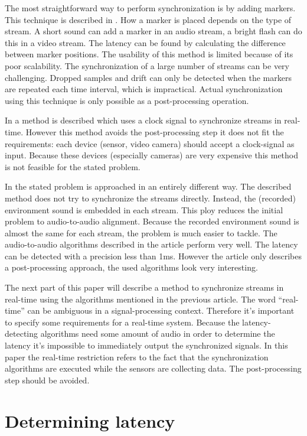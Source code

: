 \documentclass[twocolumn]{phdsymp} %
\begin{document}
The most straightforward way to perform synchronization is by adding markers. This technique is described in \cite{bannach2009automatic}. How a marker is placed depends on the type of stream. A short sound can add a marker in an audio stream, a bright flash can do this in a video stream. The latency can be found by calculating the difference between marker positions. The usability of this method is limited because of its poor scalability. The synchronization of a large number of streams can be very challenging. Dropped samples and drift can only be detected when the markers are repeated each time interval, which is impractical. Actual synchronization using this technique is only possible as a post-processing operation.

In \cite{jaimovich2010synchronization} a method is described which uses a clock signal to synchronize streams in real-time. However this method avoids the post-processing step it does not fit the requirements: each device (sensor, video camera) should accept a clock-signal as input. Because these devices (especially cameras) are very expensive this method is not feasible for the stated problem.

In \cite{six2015multimodal} the stated problem is approached in an entirely different way. The described method does not try to synchronize the streams directly. Instead, the (recorded) environment sound is embedded in each stream. This ploy reduces the initial problem to audio-to-audio alignment. Because the recorded environment sound is almost the same for each stream, the problem is much easier to tackle. The audio-to-audio algorithms described in the article perform very well. The latency can be detected with a precision less than 1ms. However the article only describes a post-processing approach, the used algorithms look very interesting.

The next part of this paper will describe a method to synchronize streams in real-time using the algorithms mentioned in the previous article. The word ``real-time'' can be ambiguous in a signal-processing context. Therefore it's important to specify some requirements for a real-time system. Because the latency-detecting algorithms need some amount of audio in order to determine the latency it's impossible to immediately output the synchronized signals. In this paper the real-time restriction refers to the fact that the synchronization algorithms are executed while the sensors are collecting data. The post-processing step should be avoided.

\section{Determining latency}
\end{document}
